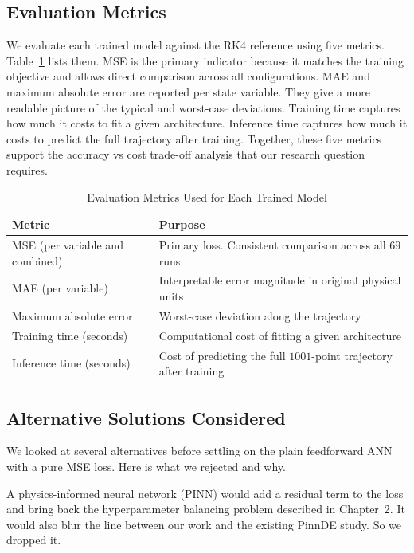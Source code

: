 \subsection{Evaluation Metrics}

We evaluate each trained model against the RK4 reference using five metrics. Table~\ref{tab:metrics} lists them. MSE is the primary indicator because it matches the training objective and allows direct comparison across all configurations. MAE and maximum absolute error are reported per state variable. They give a more readable picture of the typical and worst-case deviations. Training time captures how much it costs to fit a given architecture. Inference time captures how much it costs to predict the full trajectory after training. Together, these five metrics support the accuracy vs cost trade-off analysis that our research question requires.

\begin{table}[H]
\centering
\caption{Evaluation Metrics Used for Each Trained Model}
\label{tab:metrics}
\renewcommand{\arraystretch}{1.2}
\begin{tabular}{|l|p{9.5cm}|}
\hline
\textbf{Metric} & \textbf{Purpose} \\
\hline
MSE (per variable and combined) & Primary loss. Consistent comparison across all $69$ runs \\
\hline
MAE (per variable) & Interpretable error magnitude in original physical units \\
\hline
Maximum absolute error & Worst-case deviation along the trajectory \\
\hline
Training time (seconds) & Computational cost of fitting a given architecture \\
\hline
Inference time (seconds) & Cost of predicting the full $1001$-point trajectory after training \\
\hline
\end{tabular}
\end{table}

\subsection{Alternative Solutions Considered}

We looked at several alternatives before settling on the plain feedforward ANN with a pure MSE loss. Here is what we rejected and why.

A physics-informed neural network (PINN) would add a residual term to the loss and bring back the hyperparameter balancing problem described in Chapter~2. It would also blur the line between our work and the existing PinnDE study. So we dropped it.

